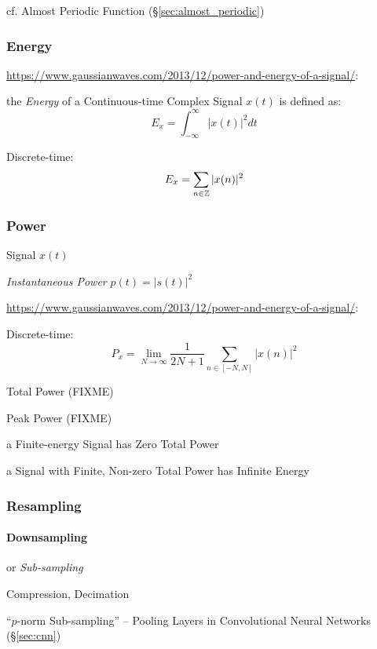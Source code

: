 cf. Almost Periodic Function (\S\ref{sec:almost_periodic})



\subsubsection{Energy}\label{sec:energy}

\url{https://www.gaussianwaves.com/2013/12/power-and-energy-of-a-signal/}:

the \emph{Energy} of a Continuous-time Complex Signal $x(t)$ is defined as:
\[
  E_x = \int_{-\infty}^\infty |x(t)|^2 dt
\]

Discrete-time:
\[
  E_x = \sum_{n \in \mathbb{Z}} |x(n)|^2
\]



\subsubsection{Power}\label{sec:signal_power}

Signal $x(t)$

\emph{Instantaneous Power} $p(t) = |s(t)|^2$

\url{https://www.gaussianwaves.com/2013/12/power-and-energy-of-a-signal/}:

Discrete-time:
\[
  P_x = \lim_{N\to\infty} \frac{1}{2N+1} \sum_{n \in [-N,N]}|x(n)|^2
\]

Total Power (FIXME)

Peak Power (FIXME)

a Finite-energy Signal has Zero Total Power

a Signal with Finite, Non-zero Total Power has Infinite Energy



\subsubsection{Resampling}\label{sec:resampling}

\paragraph{Downsampling}\label{sec:downsampling}\hfill

or \emph{Sub-sampling}

Compression, Decimation

``$p$-norm Sub-sampling'' -- Pooling Layers in Convolutional Neural Networks
(\S\ref{sec:cnn})



